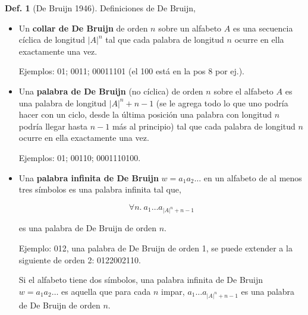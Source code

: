 \documentclass{report}
\theoremstyle{definition} %
\newtheorem{definition}{Def.}
\begin{document}
\begin{definition}[De Bruijn 1946]
    Definiciones de De Bruijn,
    \begin{itemize}
        \item Un \textbf{collar de De Bruijn} de orden $n$ sobre un alfabeto $A$
        es una secuencia cíclica de longitud $|A|^n$ tal que cada palabra de
        longitud $n$ ocurre en ella exactamente una vez.

        Ejemplos: 01; 0011; 00011101 (el 100 está en la pos 8 por ej.).

        \item Una \textbf{palabra de De Bruijn} (no cíclica) de orden $n$ sobre
        el alfabeto $A$ es una palabra de longitud $|A|^n + n - 1$ (se le agrega
        todo lo que uno podría hacer con un ciclo, desde la última posición una palabra con longitud $n$ podría llegar hasta $n-1$ más al principio) tal que cada palabra de
        longitud $n$ ocurre en ella exactamente una vez.

        Ejemplos: 01; 00110; 0001110100.

        \item Una \textbf{palabra infinita de De Bruijn} $w = a_1 a_2 \dots$ en
        un alfabeto de al menos tres símbolos es una palabra infinita tal que,

        $$\forall{n}.\ a_1\dots a_{|A|^n + n - 1}$$

        es una palabra de De Bruijn de orden $n$.

        Ejemplo: 012, una palabra de De Bruijn de orden 1, se puede extender a
        la siguiente de orden 2: 0122002110.

        Si el alfabeto tiene dos símbolos, una palabra infinita de De Bruijn $w
        = a_1 a_2 \dots$ es aquella que para cada $n$ impar, $a_1\dots a_{|A|^n
        + n - 1}$ es una palabra de De Bruijn de orden $n$.
    \end{itemize}
\end{definition}
\end{document}

